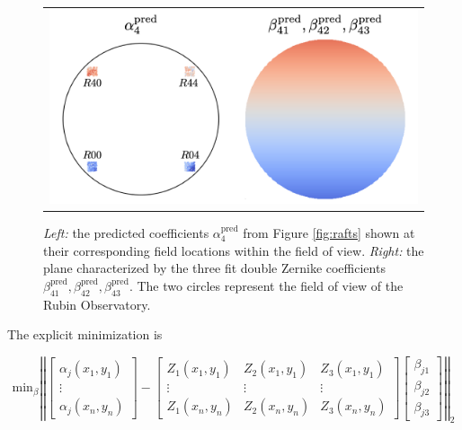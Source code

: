 \begin{figure}[!htbp]
\begin{center}
\begin{tabular}{c}
\includegraphics[width=\textwidth]{figs/interp/fieldols.png}
\end{tabular}
\end{center}
\caption[Fitting Global $\beta_{41}, \beta_{42}, \beta_{43}$ From Local $\alpha_4$ Predictions]{\textit{Left:} the predicted coefficients $\alpha_4^{\text{pred}}$ from Figure \ref{fig:rafts} shown at their corresponding field locations within the field of view. \textit{Right:} the plane characterized by the three fit double Zernike coefficients $\beta^{\text{pred}}_{41},\beta^{\text{pred}}_{42}, \beta^{\text{pred}}_{43}$. The two circles represent the field of view of the Rubin Observatory. \label{fig:ls-intuition}}
\end{figure}

The explicit minimization is 

\begin{equation*}
\label{eq:objective}
\text{min}_{\beta}\left|\left| \begin{bmatrix}\alpha_j(x_1,y_1) \\ \vdots \\ \alpha_j(x_n,y_n) \end{bmatrix} - \begin{bmatrix}Z_1(x_1,y_1) & Z_2(x_1,y_1) & Z_3(x_1,y_1) \\ \vdots & \vdots & \vdots\\  Z_1(x_n,y_n) & Z_2(x_n,y_n) & Z_3(x_n,y_n)\end{bmatrix} \begin{bmatrix}\beta_{j1} \\ \beta_{j2} \\ \beta_{j3} \end{bmatrix}\right|\right|_2
\end{equation*}

